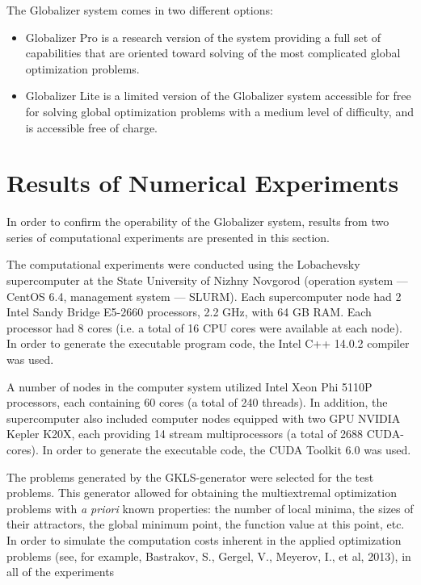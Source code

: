 \documentclass{gOMS2e}
\theoremstyle{plain}%
\theoremstyle{definition}
\theoremstyle{remark}
\begin{document}
\par
The Globalizer system comes in two different options:
\begin{itemize}
  \item Globalizer Pro is a research version of the system providing a full set of
  capabilities that are oriented toward solving of the most complicated global optimization problems.
  \item Globalizer Lite is a limited version of the Globalizer system accessible for free for
  solving global optimization problems with a medium level of difficulty, and is accessible free of charge.
\end{itemize}

\section{Results of Numerical Experiments}
\label{sec:experiments}
In order to confirm the operability of the Globalizer system, results from two
series of computational experiments are presented in this section.
\par
The computational experiments were conducted using the Lobachevsky supercomputer at the
State University of Nizhny Novgorod (operation system --- CentOS 6.4, management system --- SLURM).
Each supercomputer node had 2 Intel Sandy Bridge E5-2660 processors, 2.2 GHz, with 64 GB RAM.
Each processor had 8 cores (i.e. a total of 16 CPU cores were available at each node).
In order to generate the executable program code, the Intel C++ 14.0.2 compiler was used.
\par
A number of nodes in the computer system utilized Intel Xeon Phi 5110P processors,
each containing 60 cores (a total of 240 threads). In addition, the supercomputer also
included computer nodes equipped with two GPU NVIDIA Kepler K20X, each providing 14
stream multiprocessors (a total of 2688 CUDA-cores). In order to generate the executable
code, the CUDA Toolkit 6.0 was used.
\par
The problems generated by the GKLS-generator \cite{gavianoKvasovLeraSergeev2003}
were selected for the test problems. This generator allowed for obtaining the multiextremal
optimization problems with \textit{a priori} known properties: the number of local minima,
the sizes of their attractors, the global minimum point, the function value at this point, etc.
In order to simulate the computation costs inherent in the applied optimization problems
(see, for example, Bastrakov, S., Gergel, V., Meyerov, I., et al, 2013), in all of the experiments
\end{document}
